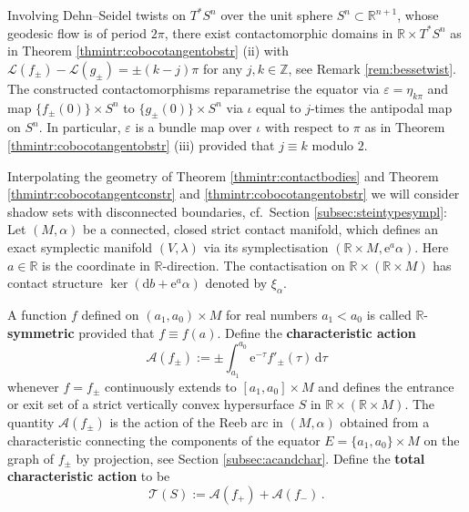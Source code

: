 \documentclass{amsart}
\theoremstyle{definition}
\newcommand{\AAA}{\mathcal A}
\newcommand{\rmd}{\mathrm d}
\newcommand{\rme}{\mathrm e}
\newcommand{\LLL}{\mathscr L}
\newcommand{\R}{\mathbb R}
\newcommand{\TT}{\mathcal T}
\newcommand{\Z}{\mathbb Z}
\begin{document}
Involving Dehn--Seidel twists on $T^*S^n$
over the unit sphere $S^n\subset\R^{n+1}$,
whose geodesic flow is of period $2\pi$,
there exist contactomorphic domains in $\R\times T^*S^n$
as in Theorem \ref{thmintr:cobocotangentobstr} (ii)
with $\LLL(f_{\pm})-\LLL(g_{\pm})=\pm(k-j)\pi$
for any $j,k\in\Z$,
see Remark \ref{rem:bessetwist}.
The constructed contactomorphisms
reparametrise the equator via $\varepsilon=\eta_{k\pi}$
and map $\{f_{\pm}(0)\}\times S^n$ to $\{g_{\pm}(0)\}\times S^n$ 
via $\iota$ equal to $j$-times the antipodal map on $S^n$.
In particular, $\varepsilon$ is a bundle map over $\iota$
with respect to $\pi$
as in Theorem \ref{thmintr:cobocotangentobstr} (iii)
provided that $j\equiv k$ modulo $2$.

Interpolating the geometry of
Theorem \ref{thmintr:contactbodies}
and Theorem
\ref{thmintr:cobocotangentconstr} and \ref{thmintr:cobocotangentobstr}
we will consider shadow sets with disconnected boundaries,
cf.\ Section \ref{subsec:steintypesympl}:
Let $(M,\alpha)$ be a connected, closed
strict contact manifold,
which defines an exact symplectic manifold $(V,\lambda)$
via its symplectisation $(\R\times M,\rme^a\alpha)$.
Here $a\in\R$ is the coordinate in $\R$-direction.
The contactisation on $\R\times(\R\times M)$
has contact structure $\ker(\rmd b+\rme^a\alpha)$
denoted by $\xi_{\alpha}$.

A function $f$ defined
on $(a_1,a_0)\times M$ for real numbers $a_1<a_0$
is called $\R$-{\bf symmetric} provided that $f\equiv f(a)$.
Define the {\bf characteristic action}
\[
\AAA(f_{\pm}):=
\pm\int_{a_1}^{a_0}
\rme^{-\tau}
f'_{\pm}(\tau)\,
\rmd\tau
\]
whenever $f=f_{\pm}$
continuously extends to
$[a_1,a_0]\times M$
and defines the entrance or exit set
of a strict vertically convex hypersurface $S$
in $\R\times(\R\times M)$.
The quantity $\AAA(f_{\pm})$
is the action of the Reeb arc in $(M,\alpha)$
obtained from a characteristic connecting
the components of the equator
$E=\{a_1,a_0\}\times M$
on the graph of $f_{\pm}$
by projection,
see Section \ref{subsec:acandchar}.
Define the {\bf total characteristic action} to be
\[
\TT(S):=
\AAA(f_+)+\AAA(f_-)
\,.
\]
\end{document}
